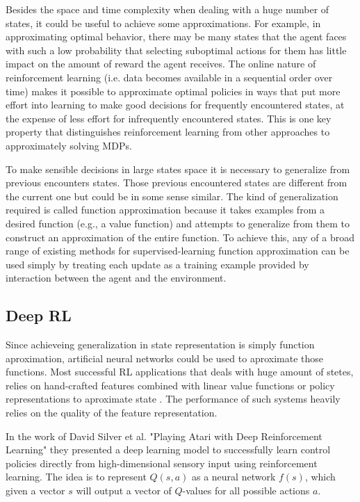 \documentclass{article}
\begin{document}
Besides the space and time complexity when dealing with a huge number of states, it could be useful to achieve some approximations. For example, in approximating optimal behavior, there may be many states that the agent faces with such a low probability that selecting suboptimal actions for them has little impact on the amount of reward the agent receives. The online nature of reinforcement learning (i.e. data becomes available in a sequential order over time) makes it possible to approximate optimal policies in ways that put more effort into learning to make good decisions for frequently encountered states, at the expense of less effort for infrequently encountered states. This is one key property that distinguishes reinforcement learning from other approaches to approximately solving MDPs.

To make sensible decisions in large states space it is necessary to generalize from previous encounters states. Those previous encountered states are different from the current one but could be in some sense similar. The kind of generalization required is called function approximation because it takes examples from a desired function (e.g., a value function) and attempts to generalize from them to construct an approximation of the entire function. To achieve this, any of a broad range of existing methods for supervised-learning function approximation can be used simply by treating each update as a training example provided by interaction between the agent and the environment.

\subsection{ Deep RL}
Since achieveing generalization in state representation is simply function aproximation, artificial neural networks could be used to aproximate those functions. 
Most successful RL applications that deals with huge amount of stetes, relies on hand-crafted features combined with linear value functions or policy representations to aproximate state \cite{mnih2013atari}. The performance of such systems heavily relies on the quality of the feature representation.

In the work of David Silver et al. "Playing Atari with Deep Reinforcement Learning" \cite{mnih2013atari} they presented a deep learning model to successfully learn control policies directly from high-dimensional sensory input using reinforcement learning. The idea is to represent $Q(s,a)$ as a neural network  $f(s)$, which given a vector $s$ will output a vector of $Q$-values for all possible actions $a$.
\end{document}
